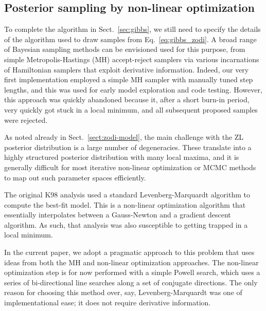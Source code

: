 \documentclass[twocolumn]{aa}
\begin{document}
\subsection{Posterior sampling by non-linear optimization}
\label{sec:nonlin}


To complete the algorithm in Sect.~\ref{sec:gibbs}, we still need to
specify the details of the algorithm used to draw samples from
Eq.~\eqref{eq:gibbs_zodi}. A broad range of Bayesian sampling methods
can be envisioned used for this purpose, from simple
Metropolis-Hastings (MH) accept-reject samplers via various
incarnations of Hamiltonian samplers that exploit derivative
information. Indeed, our very first implementation employed a simple
MH sampler with manually tuned step lengths, and this was used for
early model exploration and code testing. However, this approach was
quickly abandoned because it, after a short burn-in period, very
quickly got stuck in a local minimum, and all subsequent proposed
samples were rejected.

As noted already in Sect.~\ref{sect:zodi-model}, the main challenge
with the ZL posterior distribution is a large number of
degeneracies. These translate into a highly structured posterior
distribution with many local maxima, and it is generally difficult for
most iterative non-linear optimization or MCMC methods to map out such
parameter spaces efficiently.

The original K98 analysis used a standard Levenberg-Marquardt
algorithm to compute the best-fit model. This is a non-linear
optimization algorithm that essentially interpolates between a
Gauss-Newton and a gradient descent algorithm. As such, that analysis
was also susceptible to getting trapped in a local minimum.

In the current paper, we adopt a pragmatic approach to this problem
that uses ideas from both the MH and non-linear optimization
approaches. The non-linear optimization step is for now performed with
a simple Powell search, which uses a series of bi-directional line
searches along a set of conjugate directions. The only reason for
choosing this method over, say, Levenberg-Marquardt was one of
implementational ease; it does not require derivative information.
\end{document}
